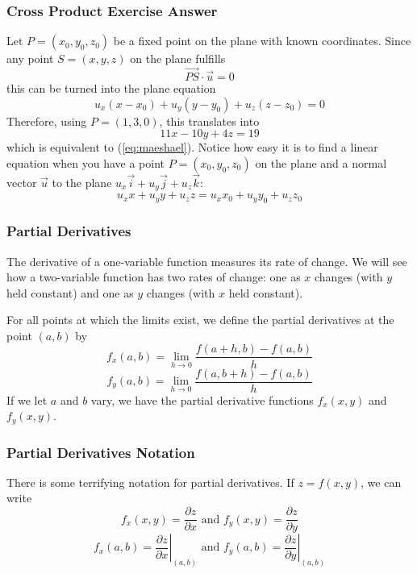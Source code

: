 \documentclass[xcolor=dvipsnames]{beamer}
\begin{document}
\begin{frame}
  \frametitle{Cross Product Exercise Answer}
  Let $P=(x_{0},y_{0},z_{0})$ be a fixed point on the plane with known
  coordinates. Since any point $S=(x,y,z)$ on the plane fulfills
\begin{equation}
  \label{eq:iefeeboh}
  \vec{PS}\cdot\vec{u}=0
\end{equation}
this can be turned into the plane equation
\begin{equation}
  \label{eq:vetiexup}
  u_{x}(x-x_{0})+u_{y}(y-y_{0})+u_{z}(z-z_{0})=0
\end{equation}
Therefore, using $P=(1,3,0)$, this translates into
\begin{equation}
  \label{eq:eechawoi}
11x-10y+4z=19  
\end{equation}
which is equivalent to (\ref{eq:maeshael}). Notice how easy it is to
find a linear equation when you have a point $P=(x_{0},y_{0},z_{0})$
on the plane and a normal vector $\vec{u}$ to the plane
$u_{x}\vec{i}+u_{y}\vec{j}+u_{z}\vec{k}$:
\begin{equation}
  \label{eq:quaghoob}
u_{x}x+u_{y}y+u_{z}z=u_{x}x_{0}+u_{y}y_{0}+u_{z}z_{0}
\end{equation}
\end{frame}

\begin{frame}
  \frametitle{Partial Derivatives}
  The derivative of a one-variable function measures its rate of
  change. We will see how a two-variable function has two rates of
  change: one as $x$ changes (with $y$ held constant) and one as $y$ changes
  (with $x$ held constant).

  \bigskip

  For all points at which the limits exist, we define the
  \alert{partial derivatives} at the point $(a,b)$ by
  \begin{equation}
    \label{eq:deeghazi}
    f_{x}(a,b)=\lim_{h\rightarrow{}0}\frac{f(a+h,b)-f(a,b)}{h}
  \end{equation}
  \begin{equation}
    \label{eq:aevoonei}
    f_{y}(a,b)=\lim_{h\rightarrow{}0}\frac{f(a,b+h)-f(a,b)}{h}
  \end{equation}
If we let $a$ and $b$ vary, we have the \alert{partial derivative
  functions} $f_{x}(x,y)$ and $f_{y}(x,y)$. 
\end{frame}

\begin{frame}
  \frametitle{Partial Derivatives Notation}
  There is some terrifying notation for partial derivatives. If
  $z=f(x,y)$, we can write
  \begin{equation}
    \label{eq:eequaeru}
f_{x}(x,y)=\frac{\partial{}z}{\partial{}x}\mbox{ and }f_{y}(x,y)=\frac{\partial{}z}{\partial{}y}
  \end{equation}
  \begin{equation}
    \label{eq:quohkahr}
f_{x}(a,b)=\left.\frac{\partial{}z}{\partial{}x}\right\vert_{(a,b)}\mbox{ and }f_{y}(a,b)=\left.\frac{\partial{}z}{\partial{}y}\right\vert_{(a,b)}
  \end{equation}
\end{frame}
\end{document}
